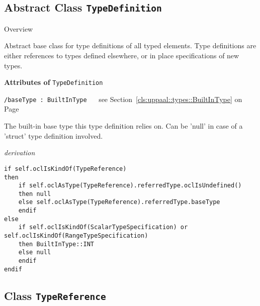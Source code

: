 \subsection{Abstract Class \bfseries \texttt{TypeDefinition}\normalfont}
\label{cls:uppaal::types::TypeDefinition} 
	
	\begin{longdescription}
		\item[Overview] 		
				

	

		Abstract base class for type definitions of all typed elements. Type definitions are either references to types defined elsewhere, or in place specifications of new types.		
		
	
			\item[\textbf{Attributes of} \texttt{TypeDefinition}] ~
			\begin{longdescription}
	\item[\texttt{/baseType : BuiltInType 	}] ~
	see Section~\ref{cls:uppaal::types::BuiltInType} on Page~\pageref{cls:uppaal::types::BuiltInType}
	
	\nopagebreak
		
				

	

		The built-in base type this type definition relies on. Can be 'null' in case of a 'struct' type definition involved.		
		\begin{longdescription}
	\item[\small\textit{derivation}] ~ 
	\nopagebreak
		\begin{lstlisting}[language=OCL, breaklines=true]
if self.oclIsKindOf(TypeReference)
then 
	if self.oclAsType(TypeReference).referredType.oclIsUndefined()
	then null
	else self.oclAsType(TypeReference).referredType.baseType
	endif
else 
	if self.oclIsKindOf(ScalarTypeSpecification) or self.oclIsKindOf(RangeTypeSpecification)
	then BuiltInType::INT
	else null
	endif
endif		\end{lstlisting}
		\end{longdescription}
			\end{longdescription}
	
	\end{longdescription}
	

\subsection{Class \bfseries \texttt{TypeReference}\normalfont}
\label{cls:uppaal::types::TypeReference} 
	
